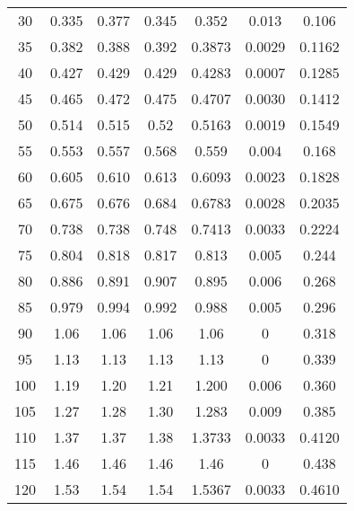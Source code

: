 \begin{table}[H]
{\begin{tabular}{
        S[table-format=3.0] 
        S[table-format=1.4] S[table-format=1.4] S[table-format=1.4]
        S[table-format=1.4] S[table-format=1.4] S[table-format=1.3]
        }
        30   & 0.335  & 0.377  & 0.345  & 0.352  & 0.013  & 0.106  \\
        35   & 0.382  & 0.388  & 0.392  & 0.3873 & 0.0029 & 0.1162 \\
        40   & 0.427  & 0.429  & 0.429  & 0.4283 & 0.0007 & 0.1285 \\
        45   & 0.465  & 0.472  & 0.475  & 0.4707 & 0.0030 & 0.1412 \\
        50   & 0.514  & 0.515  & 0.52   & 0.5163 & 0.0019 & 0.1549 \\
        55   & 0.553  & 0.557  & 0.568  & 0.559  & 0.004  & 0.168  \\
        60   & 0.605  & 0.610  & 0.613  & 0.6093 & 0.0023 & 0.1828 \\
        65   & 0.675  & 0.676  & 0.684  & 0.6783 & 0.0028 & 0.2035 \\
        70   & 0.738  & 0.738  & 0.748  & 0.7413 & 0.0033 & 0.2224 \\
        75   & 0.804  & 0.818  & 0.817  & 0.813  & 0.005  & 0.244  \\
        80   & 0.886  & 0.891  & 0.907  & 0.895  & 0.006  & 0.268  \\
        85   & 0.979  & 0.994  & 0.992  & 0.988  & 0.005  & 0.296  \\
        90   & 1.06   & 1.06   & 1.06   & 1.06   & 0      & 0.318  \\
        95   & 1.13   & 1.13   & 1.13   & 1.13   & 0      & 0.339  \\
        100  & 1.19   & 1.20   & 1.21   & 1.200  & 0.006  & 0.360  \\
        105  & 1.27   & 1.28   & 1.30   & 1.283  & 0.009  & 0.385  \\
        110  & 1.37   & 1.37   & 1.38   & 1.3733 & 0.0033 & 0.4120 \\
        115  & 1.46   & 1.46   & 1.46   & 1.46   & 0      & 0.438  \\
        120  & 1.53   & 1.54   & 1.54   & 1.5367 & 0.0033 & 0.4610 \\
        \bottomrule 
      \end{tabular}
      }
\end{table}
%
